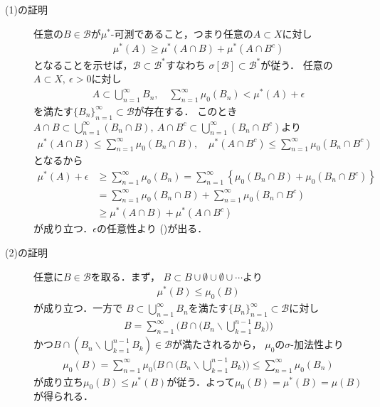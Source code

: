 		\begin{prf}\mbox{}
			\begin{description}
				\item[(1)の証明]
					任意の$B \in \mathcal{B}$が$\mu^*$-可測であること，つまり任意の$A \subset X$に対し
					\begin{align}
						\mu^*(A) \geq \mu^*(A \cap B) + \mu^*(A \cap B^c)
						\label{eq:appendix_finite_additive_measure_expansion_2}
					\end{align}
					となることを示せば，$\mathcal{B} \subset \mathcal{B}^*$すなわち
					$\sigma[\mathcal{B}] \subset \mathcal{B}^*$が従う．
					任意の$A \subset X,\ \epsilon > 0$に対し
					\begin{align}
						A \subset \bigcup_{n=1}^\infty B_n,
						\quad \sum_{n=1}^\infty \mu_0(B_n) < \mu^*(A) + \epsilon
					\end{align}
					を満たす$\{B_n\}_{n=1}^\infty \subset \mathcal{B}$が存在する．
					このとき$A \cap B \subset \bigcup_{n=1}^\infty (B_n \cap B)
					,\ A \cap B^c \subset \bigcup_{n=1}^\infty (B_n \cap B^c)$より
					\begin{align}
						\mu^*(A \cap B) \leq \sum_{n=1}^\infty \mu_0(B_n \cap B),
						\quad \mu^*(A \cap B^c) \leq \sum_{n=1}^\infty \mu_0(B_n \cap B^c)
					\end{align}
					となるから
					\begin{align}
						\mu^*(A) + \epsilon
						&\geq \sum_{n=1}^\infty \mu_0(B_n)
						= \sum_{n=1}^\infty \left\{ \mu_0(B_n \cap B) + \mu_0(B_n \cap B^c) \right\} \\
						&= \sum_{n=1}^\infty \mu_0(B_n \cap B) + \sum_{n=1}^\infty \mu_0(B_n \cap B^c) \\
						&\geq \mu^*(A \cap B) + \mu^*(A \cap B^c)
					\end{align}
					が成り立つ．$\epsilon$の任意性より
					()が出る．
				
				\item[(2)の証明]
					任意に$B \in \mathcal{B}$を取る．まず，
					$B \subset B \cup \emptyset \cup \emptyset \cup \cdots$より
					\begin{align}
						\mu^*(B) \leq \mu_0(B)
					\end{align}
					が成り立つ．一方で
					$B \subset \bigcup_{n=1}^\infty B_n$を満たす$\{B_n\}_{n=1}^\infty \subset \mathcal{B}$に対し
					\begin{align}
						B = \sum_{n=1}^\infty \Biggl( B \cap \Biggl( B_n \backslash \bigcup_{k=1}^{n-1}B_k \Biggr) \Biggr)
					\end{align}
					かつ$B \cap \left( B_n \backslash \bigcup_{k=1}^{n-1}B_k \right) \in \mathcal{B}$が満たされるから，
					$\mu_0$の$\sigma$-加法性より
					\begin{align}
						\mu_0(B) = \sum_{n=1}^\infty \mu_0\Biggl( B \cap \Biggl( B_n \backslash \bigcup_{k=1}^{n-1}B_k \Biggr) \Biggr)
						\leq \sum_{n=1}^\infty \mu_0(B_n)
					\end{align}
					が成り立ち$\mu_0(B) \leq \mu^*(B)$が従う．よって$\mu_0(B) = \mu^*(B) = \mu(B)$が得られる．
				

\end{description}
\end{prf}
